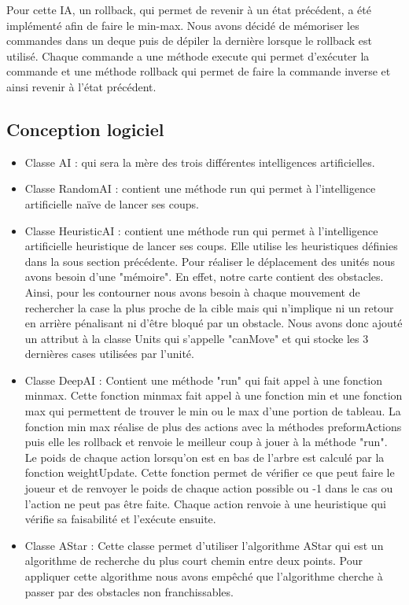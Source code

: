 \documentclass[12pt,a4paper]{article}
\begin{document}
Pour cette IA, un rollback, qui permet de revenir à un état précédent, a été implémenté afin de faire le min-max. Nous avons décidé de mémoriser les commandes dans un deque puis de dépiler la dernière lorsque le rollback est utilisé. Chaque commande a une méthode execute qui permet d'exécuter la commande et une méthode rollback qui permet de faire la commande inverse et ainsi revenir à l'état précédent.

\subsection{Conception logiciel}
\begin{itemize}
    \item Classe AI : qui sera la mère des trois différentes intelligences artificielles.
    \item Classe RandomAI : contient une méthode run qui permet à l'intelligence artificielle naïve de lancer ses coups. 
    \item Classe HeuristicAI : contient une méthode run qui permet à l'intelligence artificielle heuristique de lancer ses coups. Elle utilise les heuristiques définies dans la sous section précédente. Pour réaliser le déplacement des unités nous avons besoin d'une "mémoire". En effet, notre carte contient des obstacles. Ainsi, pour les contourner nous avons besoin à chaque mouvement de rechercher la case la plus proche de la cible mais qui n'implique ni un retour en arrière pénalisant ni d'être bloqué par un obstacle. Nous avons donc ajouté un attribut à la classe Units qui s'appelle "canMove" et qui stocke les 3 dernières cases utilisées par l'unité.
    \item Classe DeepAI : Contient une méthode "run" qui fait appel à une fonction minmax. Cette fonction minmax fait appel à une fonction min et une fonction max qui permettent de trouver le min ou le max d'une portion de tableau. La fonction min max réalise de plus des actions avec la méthodes preformActions puis elle les rollback et renvoie le meilleur coup à jouer à la méthode "run". Le poids de chaque action lorsqu'on est en bas de l'arbre est calculé par la fonction weightUpdate. Cette fonction permet de vérifier ce que peut faire le joueur et de renvoyer le poids de chaque action possible ou -1 dans le cas ou l'action ne peut pas être faite. Chaque action renvoie à une heuristique qui vérifie sa faisabilité et l'exécute ensuite. 
    \item Classe AStar : Cette classe permet d'utiliser l'algorithme AStar qui est un algorithme de recherche du plus court chemin entre deux points. Pour appliquer cette algorithme nous avons empêché que l'algorithme cherche à passer par des obstacles non franchissables.
\end{itemize}
\newpage
\end{document}
